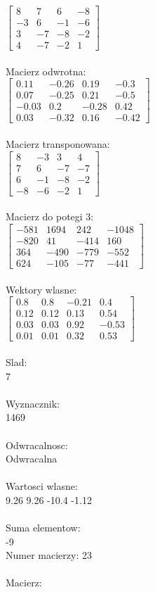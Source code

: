 \documentclass[a4paper,12pt]{article}
\begin{document}
$\begin{bmatrix} 8&7&6&-8\\-3&6&-1&-6\\3&-7&-8&-2\\4&-7&-2&1 \end{bmatrix}$
\\
\\
Macierz odwrotna:\\

$\begin{bmatrix} 0.11&-0.26&0.19&-0.3\\0.07&-0.25&0.21&-0.5\\-0.03&0.2&-0.28&0.42\\0.03&-0.32&0.16&-0.42 \end{bmatrix}$
\\
\\
Macierz transponowana:\\

$\begin{bmatrix} 8&-3&3&4\\7&6&-7&-7\\6&-1&-8&-2\\-8&-6&-2&1 \end{bmatrix}$
\\
\\
Macierz do potegi 3:\\

$\begin{bmatrix} -581&1694&242&-1048\\-820&41&-414&160\\364&-490&-779&-552\\624&-105&-77&-441 \end{bmatrix}$
\\
\\
Wektory wlasne:\\

$\begin{bmatrix} 0.8&0.8&-0.21&0.4\\0.12&0.12&0.13&0.54\\0.03&0.03&0.92&-0.53\\0.01&0.01&0.32&0.53 \end{bmatrix}$
\\
\\
Slad:\\
7
\\
\\
Wyznacznik:\\
1469
\\
\\
Odwracalnosc:\\
Odwracalna
\\
\\
Wartosci wlasne:\\
9.26 9.26 -10.4 -1.12
\\
\\
Suma elementow:\\
-9
\\
\newpage
Numer macierzy:
23
\\
\\
Macierz:\\
\end{document}
